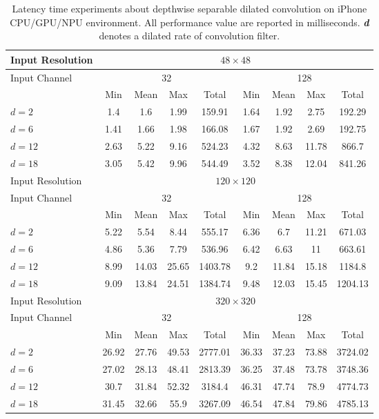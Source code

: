 \documentclass[10pt,twocolumn,letterpaper]{article}
\begin{document}
\begin{table}[ht]
\tiny
  \begin{center}

   \begin{tabular}{l| cccc | cccc}
    \hline
    Input Resolution & \multicolumn{8}{c}{$48\times48$} \\
      \hline
    Input Channel & \multicolumn{4}{c|}{32}        & \multicolumn{4}{c}{128} \\
          & Min  &  Mean & Max   & Total & Min  &  Mean & Max   & Total \\
          \hline \hline
    $d=2$ & 1.4   & 1.6   & 1.99  & 159.91 & 1.64  & 1.92  & 2.75  & 192.29 \\
    $d=6$  & 1.41  & 1.66  & 1.98  & 166.08 & 1.67  & 1.92  & 2.69  & 192.75 \\
    $d=12$  & 2.63  & 5.22  & 9.16  & 524.23 & 4.32  & 8.63  & 11.78 & 866.7 \\
    $d=18$  & 3.05  & 5.42  & 9.96  & 544.49 & 3.52  & 8.38  & 12.04 & 841.26 \\
    \hline
    Input Resolution & \multicolumn{8}{c}{$120\times120$} \\
      \hline
    Input Channel & \multicolumn{4}{c|}{32}        & \multicolumn{4}{c}{128} \\
         & Min  &  Mean & Max   & Total & Min  &  Mean & Max   & Total \\
           \hline \hline
    $d=2$  & 5.22  & 5.54  & 8.44  & 555.17 & 6.36  & 6.7   & 11.21 & 671.03 \\
    $d=6$  & 4.86  & 5.36  & 7.79  & 536.96 & 6.42  & 6.63  & 11    & 663.61 \\
    $d=12$  & 8.99  & 14.03 & 25.65 & 1403.78 & 9.2   & 11.84 & 15.18 & 1184.8 \\
    $d=18$  & 9.09  & 13.84 & 24.51 & 1384.74 & 9.48  & 12.03 & 15.45 & 1204.13 \\
      \hline
    Input Resolution & \multicolumn{8}{c}{$320\times320$} \\
      \hline
    Input Channel & \multicolumn{4}{c|}{32}        & \multicolumn{4}{c}{128} \\
          & Min  &  Mean & Max   & Total & Min  &  Mean & Max   & Total\\
           \hline \hline
    $d=2$  & 26.92 & 27.76 & 49.53 & 2777.01 & 36.33 & 37.23 & 73.88 & 3724.02 \\
    $d=6$  & 27.02 & 28.13 & 48.41 & 2813.39 & 36.25 & 37.48 & 73.78 & 3748.36 \\
    $d=12$  & 30.7  & 31.84 & 52.32 & 3184.4 & 46.31 & 47.74 & 78.9  & 4774.73 \\
    $d=18$  & 31.45 & 32.66 & 55.9  & 3267.09 & 46.54 & 47.84 & 79.86 & 4785.13 \\
    \hline
    \end{tabular}\end{center}
 
  \caption{Latency time experiments about depthwise separable dilated convolution on iPhone CPU/GPU/NPU environment. All performance value are reported in milliseconds. \textit{\textbf{d}} denotes a dilated rate of convolution filter.}
   \label{tab:latency1}\end{table}
\end{document}
